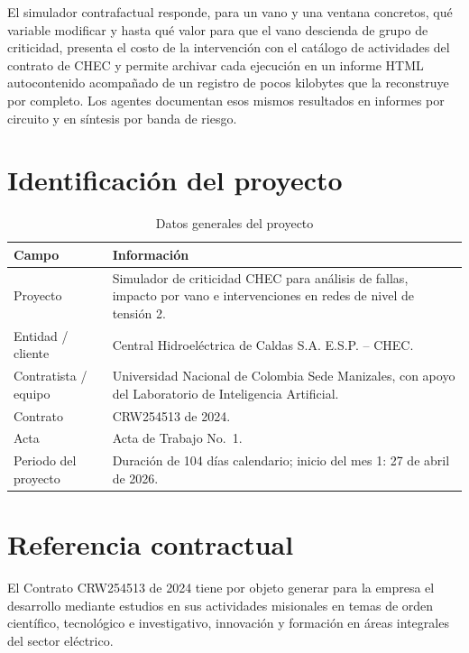 \documentclass[11pt,a4paper]{article}
\begin{document}
El simulador contrafactual responde, para un vano y una ventana concretos, qué variable
modificar y hasta qué valor para que el vano descienda de grupo de criticidad, presenta el
costo de la intervención con el catálogo de actividades del contrato de CHEC y permite
archivar cada ejecución en un informe HTML autocontenido acompañado de un registro de pocos
kilobytes que la reconstruye por completo. Los agentes documentan esos mismos resultados en
informes por circuito y en síntesis por banda de riesgo.

\section{Identificación del proyecto}

\begin{table}[H]
\centering
\caption{Datos generales del proyecto}
\label{tab:identificacion}
\small
\begin{tabularx}{\textwidth}{L{4.6cm} X}
\toprule
\textbf{Campo} & \textbf{Información} \\
\midrule
Proyecto & Simulador de criticidad CHEC para análisis de fallas, impacto por vano e intervenciones en redes de nivel de tensión 2. \\
Entidad / cliente & Central Hidroeléctrica de Caldas S.A. E.S.P. -- CHEC. \\
Contratista / equipo & Universidad Nacional de Colombia Sede Manizales, con apoyo del Laboratorio de Inteligencia Artificial. \\
Contrato & CRW254513 de 2024. \\
Acta & Acta de Trabajo No.~1. \\
Periodo del proyecto & Duración de 104 días calendario; inicio del mes 1: 27 de abril de 2026. \\
\bottomrule
\end{tabularx}
\end{table}

\section{Referencia contractual}

El Contrato CRW254513 de 2024 tiene por objeto generar para la empresa el desarrollo mediante
estudios en sus actividades misionales en temas de orden científico, tecnológico e
investigativo, innovación y formación en áreas integrales del sector eléctrico.
\end{document}

